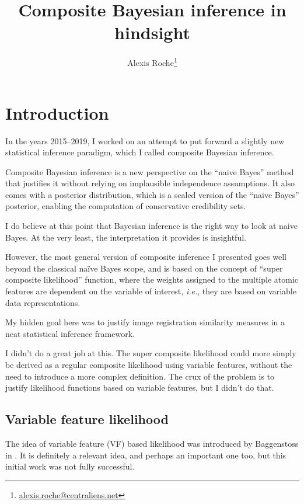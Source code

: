 \documentclass[english]{scrartcl}
\title{Composite Bayesian inference in hindsight}
\author{Alexis Roche\thanks{\url{alexis.roche@centraliens.net}}}
\begin{document}
\maketitle

\section{Introduction}

In the years 2015--2019, I worked on an attempt to put forward a slightly new statistical inference paradigm, which I called composite Bayesian inference.

Composite Bayesian inference is a new perspective on the ``naive Bayes'' method that justifies it without relying on implausible independence assumptions. It also comes with a posterior distribution, which is a scaled version of the ``naive Bayes'' posterior, enabling the computation of conservative credibility sets.

I do believe at this point that Bayesian inference is the right way to look at naive Bayes. At the very least, the interpretation it provides is insightful.

However, the most general version of composite inference I presented goes well beyond the classical na\"ive Bayes scope, and is based on the concept of ``super composite likelihood'' function, where the weights assigned to the multiple atomic features are dependent on the variable of interest, {\em i.e.}, they are based on variable data representations. 

My hidden goal here was to justify image registration similarity measures in a neat statistical inference framework.

I didn't do a great job at this. The super composite likelihood could more simply be derived as a regular composite likelihood using variable features, without the need to introduce a more complex definition. The crux of the problem is to justify likelihood functions based on variable features, but I didn't do that.

\subsection{Variable feature likelihood}

The idea of variable feature (VF) based likelihood was introduced by Baggenstoss in \cite{Baggenstoss-03}. It is definitely a relevant idea, and perhaps an important one too, but this initial work was not fully successful.
\end{document}
